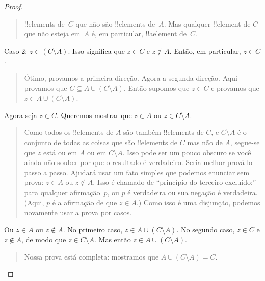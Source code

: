 \documentclass[../../../include/open-logic-section]{subfiles}
\begin{document}
\begin{proof}
\begin{quote}
    !!{element}s de~$C$ que não são !!{element}s de~$A$.  Mas qualquer
    !!{element} de $C$ que não esteja em~$A$ é, em particular, !!a{element} de~$C$.
  \end{quote}
  Caso 2: $z \in (C \setminus A)$.  Isso significa que $z \in C$ e $z
  \notin A$. Então, em particular, $z \in C$.
  \begin{quote}
    Ótimo, provamos a primeira direção. Agora a segunda
    direção. Aqui provamos que $C \subseteq A \cup (C \setminus
    A)$.  Então supomos que $z \in C$ e provamos que $z \in A \cup (C
    \setminus A)$.
  \end{quote}
  Agora seja $z \in C$. Queremos mostrar que $z \in A$ ou $z \in C
  \setminus A$.
  \begin{quote}
    Como todos os !!{element}s de $A$ são também !!{element}s de $C$, e $C
    \setminus A$ é o conjunto de todas as coisas que são !!{element}s de $C$
    mas não de $A$, segue-se que $z$ está ou em $A$ ou em $C
    \setminus A$.  Isso pode ser um pouco obscuro se você ainda não souber
    por que o resultado é verdadeiro.  Seria melhor prová-lo
    passo a passo.  Ajudará usar um fato simples que podemos
    enunciar sem prova: $z \in A$ ou $z \notin A$. Isso é chamado de
    ``princípio do terceiro excluído:'' para qualquer afirmação~$p$, ou
    $p$ é verdadeira ou sua negação é verdadeira. (Aqui, $p$ é a afirmação
    de que $z \in A$.)  Como isso é uma disjunção, podemos novamente usar
    a prova por casos.
  \end{quote}
  Ou $z \in A$ ou $z \notin A$. No primeiro caso, $z \in A \cup
  (C \setminus A)$. No segundo caso, $z \in C$ e $z \notin A$, de modo que
  $z \in C \setminus A$.  Mas então $z \in A \cup (C \setminus A)$.
  \begin{quote}
    Nossa prova está completa: mostramos que $A \cup (C \setminus A) = C$.
  \end{quote}
\end{proof}
\end{document}
